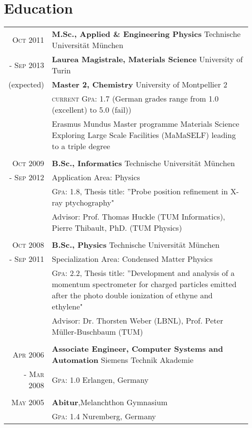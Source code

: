 \documentclass[a4paper,10pt]{article}
\begin{document}
\section{Education}
\begin{tabularx}{19cm}{rX}	

\textsc{Oct 2011}& \textbf{M.Sc., Applied \& Engineering Physics} \hfill{Technische Universität München}\\
\textsc{- Sep 2013} & \textbf{Laurea Magistrale, Materials Science} \hfill{University of Turin}\\
 (expected)&  \textbf{Master 2, Chemistry} \hfill{University of Montpellier 2}\\
 &  \textsc{current Gpa}: 1.7 (German grades range from 1.0 \small{(excellent)} to 5.0 \small{(fail)})\\& \small{Erasmus Mundus Master programme Materials Science Exploring Large Scale Facilities (MaMaSELF) leading to a
triple degree}\\\\

\textsc{Oct 2009}& \textbf{B.Sc., Informatics} \hfill{Technische Universität München}\\
\textsc{- Sep 2012} & Application Area: Physics\\
 & \textsc{Gpa}: 1.8, \small{Thesis title: ”Probe position refinement in X-ray ptychography"}\\
& Advisor: Prof. Thomas Huckle (TUM Informatics), Pierre Thibault, PhD. (TUM Physics)
\\ \\

\textsc{Oct 2008}& \textbf{B.Sc.,  Physics} \hfill\normalsize{Technische Universität München}\\
 \textsc{- Sep 2011}& Specialization Area: Condensed Matter Physics \\
& \textsc{Gpa}: 2.2, \small{Thesis title: ”Development and analysis of a momentum spectrometer for charged particles emitted after the photo double ionization of ethyne and ethylene"}\\
& Advisor: Dr. Thorsten Weber (LBNL),  Prof. Peter Müller-Buschbaum (TUM) \\\\


\textsc{Apr 2006}& \textbf{Associate Engineer, Computer Systems and Automation} \hfill  {Siemens Technik Akademie}\\
\textsc{- Mar 2008}& \textsc{Gpa}: 1.0  \hfill Erlangen, Germany\\
 &\\ 

\textsc{May} 2005& \textbf{Abitur},\hfill  Melanchthon Gymnasium \\
&  \textsc{Gpa}: 1.4 \hfill Nuremberg, Germany

\end{tabularx}
\end{document}
